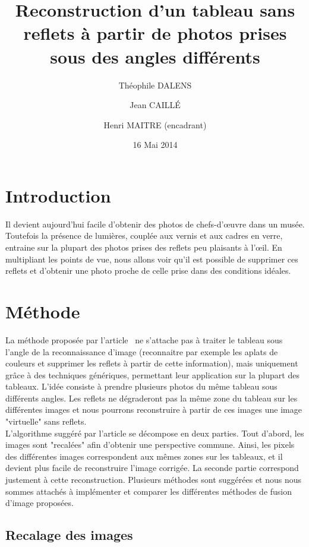 \documentclass[12pt,a4paper]{article}
\title{Reconstruction d'un tableau sans reflets à partir de photos prises sous des angles différents}
\date{16 Mai 2014}
\author{Théophile DALENS \and Jean CAILLÉ \and Henri MAITRE (encadrant)}
\begin{document}
\maketitle

\section{Introduction}
Il devient aujourd'hui facile d'obtenir des photos de chefs-d'œuvre dans un musée. Toutefois la présence de lumières, couplée aux vernis et aux cadres en verre, entraine sur la plupart des photos prises des reflets peu plaisants à l'œil. En multipliant les points de vue, nous allons voir qu'il est possible de supprimer ces reflets et d'obtenir une photo proche de celle prise dans des conditions idéales.

\section{Méthode}

La méthode proposée par l'article~\citep{haro2012photographing} ne s'attache pas à traiter le tableau sous l'angle de la reconnaissance d'image (reconnaitre par exemple les aplats de couleurs et supprimer les reflets à partir de cette information), mais uniquement grâce à des techniques génériques, permettant leur application sur la plupart des tableaux. L'idée consiste à prendre plusieurs photos du même tableau sous différents angles. Les reflets ne dégraderont pas la même zone du tableau sur les différentes images et nous pourrons reconstruire à partir de ces images une image "virtuelle" sans reflets.\\

L'algorithme suggéré par l'article se décompose en deux parties. Tout d'abord, les images sont "recalées" afin d'obtenir une perspective commune. Ainsi, les pixels des différentes images correspondent aux mêmes zones sur les tableaux, et il devient plus facile de reconstruire l'image corrigée. La seconde partie correspond justement à cette reconstruction. Plusieurs méthodes sont suggérées et nous nous sommes attachés à implémenter et comparer les différentes méthodes de fusion d'image proposées.

\subsection{Recalage des images}
\end{document}
